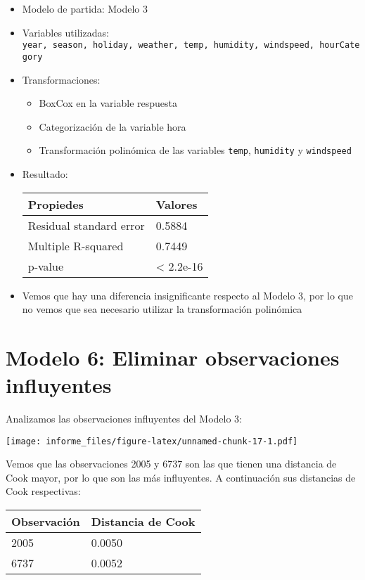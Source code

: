 \documentclass[
]{article}
\providecommand{\tightlist}{%
  \setlength{\itemsep}{0pt}\setlength{\parskip}{0pt}}
\begin{document}
\begin{itemize}
\item
  Modelo de partida: Modelo 3
\item
  Variables utilizadas:
  \texttt{year,\ season,\ holiday,\ weather,\ temp,\ humidity,\ windspeed,\ hourCategory}
\item
  Transformaciones:

  \begin{itemize}
  \tightlist
  \item
    BoxCox en la variable respuesta
  \item
    Categorización de la variable hora
  \item
    Transformación polinómica de las variables \texttt{temp},
    \texttt{humidity} y \texttt{windspeed}
  \end{itemize}
\item
  Resultado:

  \begin{longtable}[]{@{}ll@{}}
  \toprule
  Propiedes & Valores\tabularnewline
  \midrule
  \endhead
  Residual standard error & 0.5884\tabularnewline
  Multiple R-squared & 0.7449\tabularnewline
  p-value & \textless{} 2.2e-16\tabularnewline
  \bottomrule
  \end{longtable}
\item
  Vemos que hay una diferencia insignificante respecto al Modelo 3, por
  lo que no vemos que sea necesario utilizar la transformación
  polinómica
\end{itemize}

\hypertarget{modelo-6-eliminar-observaciones-influyentes}{%
\section{Modelo 6: Eliminar observaciones
influyentes}\label{modelo-6-eliminar-observaciones-influyentes}}

Analizamos las observaciones influyentes del Modelo 3:

\texttt{[image: informe\_files/figure-latex/unnamed-chunk-17-1.pdf]}

Vemos que las observaciones 2005 y 6737 son las que tienen una distancia
de Cook mayor, por lo que son las más influyentes. A continuación sus
distancias de Cook respectivas:

\begin{longtable}[]{@{}ll@{}}
\toprule
Observación & Distancia de Cook\tabularnewline
\midrule
\endhead
2005 & 0.0050\tabularnewline
6737 & 0.0052\tabularnewline
\bottomrule
\end{longtable}
\end{document}
